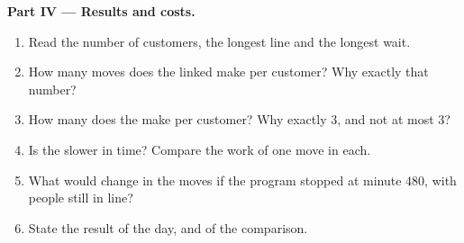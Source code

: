 \begin{problem}
\medskip\noindent\textbf{Part IV --- Results and costs.}
\begin{enumerate}[resume]
  \item Read the number of customers, the longest line and the longest wait.
  \item How many moves does the linked  make per customer? Why exactly that number?
  \item How many does the   make per customer? Why exactly $3$, and not at most $3$?
  \item Is the   slower in time? Compare the work of one move in each.
  \item What would change in the moves if the program stopped at minute $480$, with people still in line?
  \item State the result of the day, and of the comparison.
\end{enumerate}
\end{problem}
